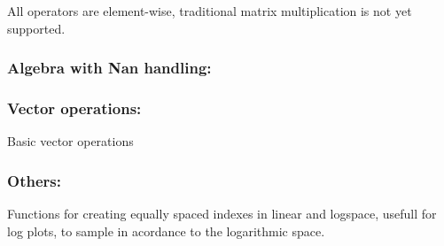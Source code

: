 All operators are element-wise, traditional matrix multiplication is not
yet supported.

\begin{Shaded}
\begin{Highlighting}[]
\end{Highlighting}
\end{Shaded}

\subsubsection{Algebra with Nan
handling:}\label{algebra-with-nan-handling}

\begin{Shaded}
\begin{Highlighting}[]
\end{Highlighting}
\end{Shaded}

\subsubsection{Vector operations:}\label{vector-operations}

Basic vector operations

\begin{Shaded}
\begin{Highlighting}[]
\end{Highlighting}
\end{Shaded}

\subsubsection{Others:}\label{others}

Functions for creating equally spaced indexes in linear and logspace,
usefull for log plots, to sample in acordance to the logarithmic space.

\begin{Shaded}
\begin{Highlighting}[]
\end{Highlighting}
\end{Shaded}

